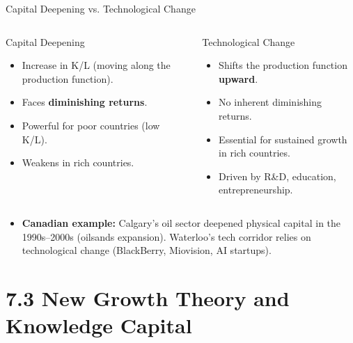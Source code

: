 \documentclass[aspectratio=169]{beamer}
\begin{document}
\begin{frame}{Capital Deepening vs. Technological Change}
\transfade
\begin{columns}
\begin{block}{\textcolor{accent}{Capital Deepening}}
\begin{itemize}
  \item Increase in K/L (moving along the production function).
  \item Faces \textbf{diminishing returns}.
  \item Powerful for poor countries (low K/L).
  \item Weakens in rich countries.
\end{itemize}
\end{block}
\begin{block}{\textcolor{leafgreen}{Technological Change}}
\begin{itemize}
  \item Shifts the production function \textbf{upward}.
  \item No inherent diminishing returns.
  \item Essential for sustained growth in rich countries.
  \item Driven by R\&D, education, entrepreneurship.
\end{itemize}
\end{block}
\end{columns}
\vspace{0.5em}
\begin{itemize}
  \item \textbf{Canadian example:} Calgary's oil sector deepened physical capital in the 1990s--2000s (oilsands expansion). Waterloo's tech corridor relies on technological change (BlackBerry, Miovision, AI startups).
\end{itemize}
\end{frame}

\section{7.3 New Growth Theory and Knowledge Capital}
\end{document}
